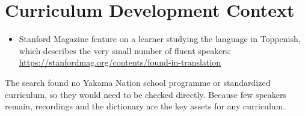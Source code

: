 \documentclass[12pt]{article}
\begin{document}
\section{Curriculum Development Context}
\begin{itemize}
\item Stanford Magazine feature on a learner studying the language in Toppenish, which describes the very small number of fluent speakers: \url{https://stanfordmag.org/contents/found-in-translation}
\end{itemize}
The search found no Yakama Nation school programme or standardized curriculum, so they would need to be checked directly. Because few speakers remain, recordings and the dictionary are the key assets for any curriculum.
\end{document}
